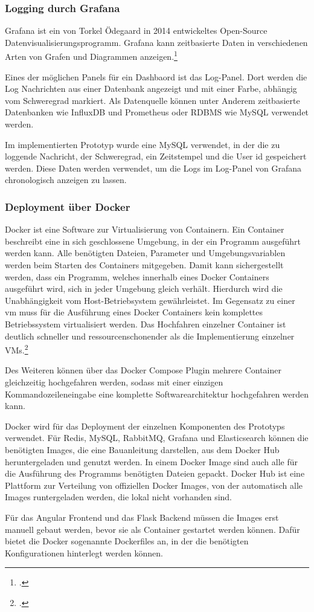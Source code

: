 \subsubsection{Logging durch Grafana}
Grafana ist ein von Torkel Ödegaard in 2014 entwickeltes Open-Source Datenvisualisierungsprogramm. Grafana kann zeitbasierte Daten in verschiedenen Arten von Grafen und Diagrammen anzeigen.\footcite{chakraborty2021grafana}

Eines der möglichen Panels für ein Dashbaord ist das Log-Panel. Dort werden die Log Nachrichten aus einer Datenbank angezeigt und mit einer Farbe, abhängig vom Schweregrad markiert. Als Datenquelle können unter Anderem zeitbasierte Datenbanken wie InfluxDB und Prometheus oder RDBMS wie MySQL verwendet werden.

Im implementierten Prototyp wurde eine MySQL verwendet, in der die zu loggende Nachricht, der Schweregrad, ein Zeitstempel und die User \ac{id} gespeichert werden. Diese Daten werden verwendet, um die Logs im Log-Panel von Grafana chronologisch anzeigen zu lassen.

\subsubsection{Deployment über Docker}
Docker ist eine Software zur Virtualisierung von Containern. Ein Container beschreibt eine in sich geschlossene Umgebung, in der ein Programm ausgeführt werden kann. Alle benötigten Dateien, Parameter und Umgebungsvariablen werden beim Starten des Containers mitgegeben. Damit kann sichergestellt werden, dass ein Programm, welches innerhalb eines Docker Containers ausgeführt wird, sich in jeder Umgebung gleich verhält. Hierdurch wird die Unabhängigkeit vom Host-Betriebsystem gewährleistet. Im Gegensatz zu einer \ac{vm} muss für die Ausführung eines Docker Containers kein komplettes Betriebssystem virtualisiert werden. Das Hochfahren einzelner Container ist deutlich schneller und ressourcenschonender als die Implementierung einzelner VMs.\footcite{anderson2015docker}

Des Weiteren können über das Docker Compose Plugin mehrere Container gleichzeitig hochgefahren werden, sodass mit einer einzigen Kommandozeileneingabe eine komplette Softwarearchitektur hochgefahren werden kann.

Docker wird für das Deployment der einzelnen Komponenten des Prototyps verwendet. Für Redis, MySQL, RabbitMQ, Grafana und Elasticsearch können die benötigten Images, die eine Bauanleitung darstellen, aus dem Docker Hub heruntergeladen und genutzt werden. In einem Docker Image sind auch alle für die Ausführung des Programms benötigten Dateien gepackt. Docker Hub ist eine Plattform zur Verteilung von offiziellen Docker Images, von der automatisch alle Images runtergeladen werden, die lokal nicht vorhanden sind.

Für das Angular Frontend und das Flask Backend müssen die Images erst manuell gebaut werden, bevor sie als Container gestartet werden können. Dafür bietet die Docker sogenannte Dockerfiles an, in der die benötigten Konfigurationen hinterlegt werden können.


